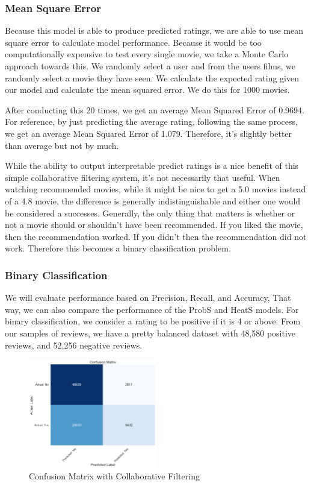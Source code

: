 \documentclass[12pt]{article}
\numberwithin{equation}{section}
\begin{document}
\subsubsection{Mean Square Error}
Because this model is able to produce predicted ratings, we are able to use mean square error to calculate model performance.  Because it would be too computationally expensive to test every single movie, we take a Monte Carlo approach towards this. We randomly select a user and from the users films, we randomly select a movie they have seen. We calculate the expected rating given our model and calculate the mean squared error. We do this for 1000 movies.

After conducting this 20 times, we get an average Mean Squared Error of 0.9694. For reference, by just predicting the average rating, following the same process, we get an average Mean Squared Error of 1.079. Therefore, it's slightly better than average but not by much.

While the ability to output interpretable predict ratings is a nice benefit of this simple collaborative filtering system, it's not necessarily that useful. When watching recommended movies, while it might be nice to get a 5.0 movies instead of a 4.8 movie, the difference is generally indistinguishable and either one would be considered a successes. Generally, the only thing that matters is whether or not a movie should or shouldn't have been recommended. If you liked the movie, then the recommendation worked. If you didn't then the recommendation did not work. Therefore this becomes a binary classification problem.

\subsubsection{Binary Classification}

We will evaluate performance based on Precision, Recall, and Accuracy, That way, we can also compare the performance of the ProbS and HeatS models. For binary classification, we consider a rating to be positive if it is 4 or above. From our samples of reviews, we have a pretty balanced dataset with 48,580 positive reviews, and 52,256 negative reviews.

\begin{figure}[t]
  \centering
  \includegraphics[width=0.5\textwidth]{conf_mat.png}
  \caption{Confusion Matrix with Collaborative Filtering}
  \label{fig:UN_degreeinfo}
\end{figure}
\end{document}
